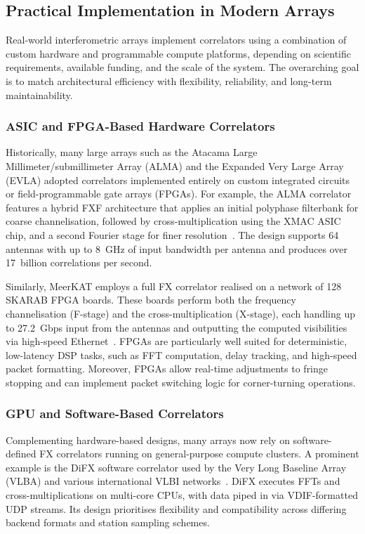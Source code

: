     \subsection{Practical Implementation in Modern Arrays}
    Real-world interferometric arrays implement correlators using a combination of custom hardware and programmable compute platforms, depending on scientific requirements, available funding, and the scale of the system. The overarching goal is to match architectural efficiency with flexibility, reliability, and long-term maintainability. 

        \subsubsection{ASIC and FPGA-Based Hardware Correlators}
        Historically, many large arrays such as the Atacama Large Millimeter/submillimeter Array (ALMA) and the Expanded Very Large Array (EVLA) adopted correlators implemented entirely on custom integrated circuits or field-programmable gate arrays (FPGAs). For example, the ALMA correlator features a hybrid FXF architecture that applies an initial polyphase filterbank for coarse channelisation, followed by cross-multiplication using the XMAC ASIC chip, and a second Fourier stage for finer resolution~\cite{Escoffier2007}. The design supports 64 antennas with up to 8~GHz of input bandwidth per antenna and produces over 17~billion correlations per second.

        Similarly, MeerKAT employs a full FX correlator realised on a network of 128 SKARAB FPGA boards. These boards perform both the frequency channelisation (F-stage) and the cross-multiplication (X-stage), each handling up to 27.2~Gbps input from the antennas and outputting the computed visibilities via high-speed Ethernet~\cite{Romein2021}. FPGAs are particularly well suited for deterministic, low-latency DSP tasks, such as FFT computation, delay tracking, and high-speed packet formatting. Moreover, FPGAs allow real-time adjustments to fringe stopping and can implement packet switching logic for corner-turning operations.

        \subsubsection{GPU and Software-Based Correlators}
        Complementing hardware-based designs, many arrays now rely on software-defined FX correlators running on general-purpose compute clusters. A prominent example is the DiFX software correlator used by the Very Long Baseline Array (VLBA) and various international VLBI networks~\cite{Deller2011}. DiFX executes FFTs and cross-multiplications on multi-core CPUs, with data piped in via VDIF-formatted UDP streams. Its design prioritises flexibility and compatibility across differing backend formats and station sampling schemes.

